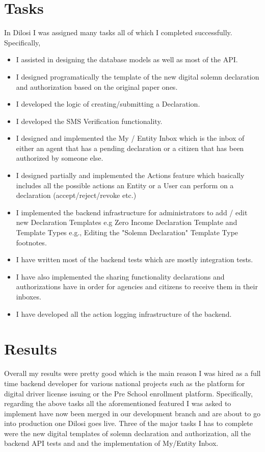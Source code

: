 \section{Tasks}
In Dilosi I was assigned many tasks all of which I completed successfully. Specifically, 
\begin{itemize}
\item I assisted in designing the database models as well as most of the API.
\item I designed programatically the template of the new digital solemn declaration and authorization based on the original paper ones.
\item I developed the logic of creating/submitting a Declaration.
\item I developed the SMS Verification functionality.
\item I designed and implemented the My / Entity Inbox which is the inbox of either an agent that has a pending declaration or a citizen that has been authorized by someone else.
\item I designed partially and implemented the Actions feature which basically includes all the possible actions an Entity or a User can perform on a declaration (accept/reject/revoke etc.)
\item I implemented the backend infrastructure for administrators to add / edit new Declaration Templates e.g Zero Income Declaration Template and Template Types e.g., Editing the "Solemn Declaration" Template Type footnotes.
\item I have written most of the backend tests which are mostly integration tests.
\item  I have also implemented the sharing functionality declarations and authorizations have in order for agencies and citizens to receive them in their inboxes.
\item I have developed all the action logging infrastructure of the backend.
\end{itemize}


\section{Results}
Overall my results were pretty good which is the main reason I was hired as a full time 
backend developer for various national projects such as the platform for digital driver license
issuing or the Pre School enrollment platform. Specifically, regarding the above tasks all the 
aforementioned featured I was asked to implement have now been merged in our development branch
and are about to go into production one Dilosi goes live. Three of the major tasks I has to complete
were the new digital templates of solemn declaration and authorization, all the backend API tests and
and the implementation of My/Entity Inbox.


